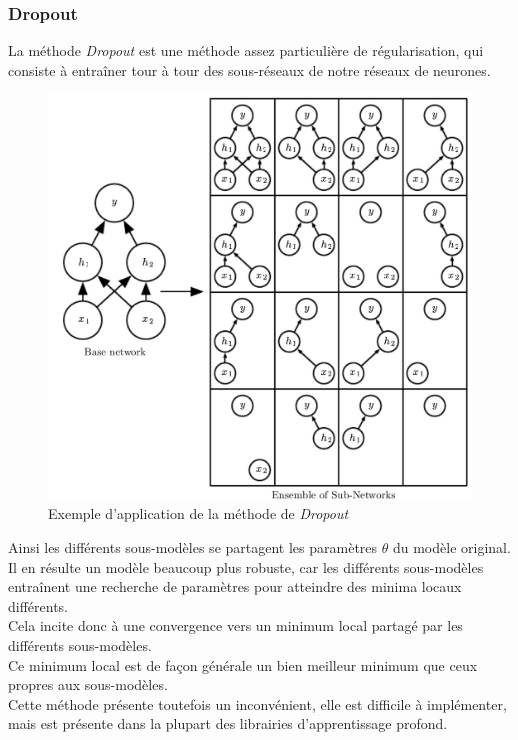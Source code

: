 \documentclass[10pt,a4paper]{report}
\begin{document}
			\subsubsection{Dropout}
			La méthode \emph{Dropout} est une méthode assez particulière de régularisation, qui consiste à entraîner tour à tour des sous-réseaux de notre réseaux de neurones.
			\begin{figure}[H]
				\begin{center}
					\includegraphics[scale=0.25]{Images/dropout.png}
					\caption{Exemple d'application de la méthode de \emph{Dropout}}
				\end{center}
			\end{figure}
			Ainsi les différents sous-modèles se partagent les paramètres $\theta$ du modèle original.\\
			Il en résulte un modèle beaucoup plus robuste, car les différents sous-modèles entraînent une recherche de paramètres pour atteindre des minima locaux différents.\\
			Cela incite donc à une convergence vers un minimum local partagé par les différents sous-modèles.\\
			Ce minimum local est de façon générale un bien meilleur minimum que ceux propres aux sous-modèles.\\
			Cette méthode présente toutefois un inconvénient, elle est difficile à implémenter, mais est présente dans la plupart des librairies d'apprentissage profond.
\end{document}
